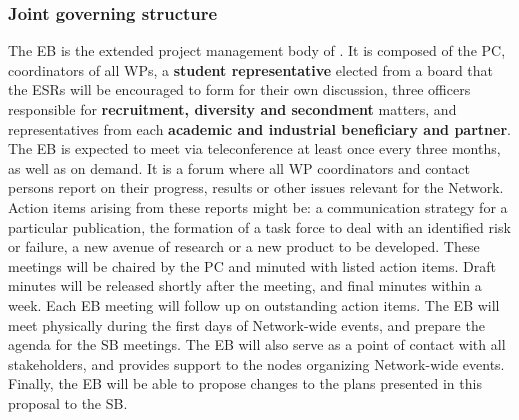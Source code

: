 %
\vspace{-2mm}
\subsubsection{Joint governing structure}%
\label{sub:jointGoverningStructure}

The EB is the extended project management body of \acronym. 
It is composed of the PC, coordinators of all WPs, a \textbf{student representative} elected from a board that the ESRs will be encouraged to form for their own discussion, three officers responsible for \textbf{recruitment, diversity and secondment} matters, and representatives from each \textbf{academic and industrial beneficiary and partner}. 
The EB is expected to meet via teleconference at least once every three months, as well as on demand.
It is a forum where all WP coordinators and contact persons report on their progress, results or other issues relevant for the Network. 
Action items arising from these reports might be: a communication strategy for a particular publication, the formation of a task force to deal with an identified risk or failure, a new avenue of research or a new product to be developed. 
These meetings will be chaired by the PC and minuted with listed action items. 
Draft minutes will be released shortly after the meeting, and final minutes within a week. 
Each EB meeting will follow up on outstanding action items.
The EB will meet physically during the first days of Network-wide events, and prepare the agenda for the SB meetings. 
The EB will also serve as a point of contact with all \acronym stakeholders, and provides support to the nodes organizing Network-wide events.
Finally, the EB will be able to propose changes to the plans presented in this proposal to the SB.

